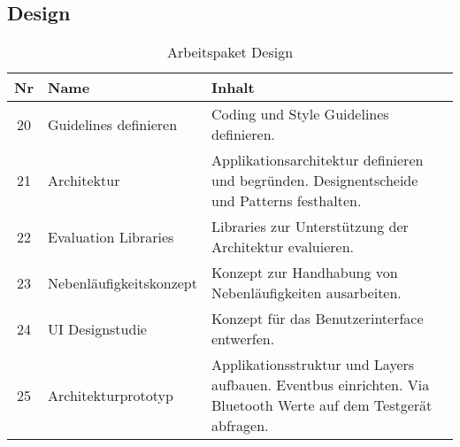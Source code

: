 \subsection{Design}
\begin{table}[H]
\begin{tabularx}{\textwidth}{ c | l | X }
\textbf{Nr} & \textbf{Name} & \textbf{Inhalt} \\ \hline
20 & Guidelines definieren & Coding und Style Guidelines definieren.\\ \hline
21 & Architektur & Applikationsarchitektur definieren und begründen. Designentscheide und Patterns festhalten.\\ \hline
22 & Evaluation Libraries & Libraries zur Unterstützung der Architektur evaluieren.\\ \hline
23 & Nebenläufigkeitskonzept & Konzept zur Handhabung von Nebenläufigkeiten ausarbeiten.\\ \hline
24 & UI Designstudie & Konzept für das Benutzerinterface entwerfen.\\ \hline
25 & Architekturprototyp & Applikationsstruktur und Layers aufbauen. Eventbus einrichten. Via Bluetooth Werte auf dem Testgerät abfragen.\\ 
\end{tabularx}
\caption{Arbeitspaket Design}
\end{table}

